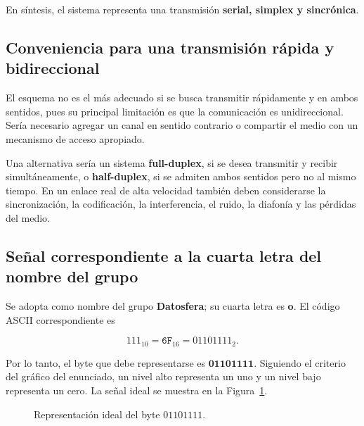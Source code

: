 \documentclass[12pt,a4paper]{article}
\begin{document}
En síntesis, el sistema representa una transmisión
\textbf{serial, simplex y sincrónica}.

\subsection{Conveniencia para una transmisión rápida y bidireccional}

El esquema no es el más adecuado si se busca transmitir rápidamente y en ambos
sentidos, pues su principal limitación es que la comunicación es unidireccional.
Sería necesario agregar un canal en sentido contrario o compartir el medio con
un mecanismo de acceso apropiado.

Una alternativa sería un sistema \textbf{full-duplex}, si se desea transmitir y
recibir simultáneamente, o \textbf{half-duplex}, si se admiten ambos sentidos
pero no al mismo tiempo. En un enlace real de alta velocidad también deben
considerarse la sincronización, la codificación, la interferencia, el ruido, la
diafonía y las pérdidas del medio.

\subsection{Señal correspondiente a la cuarta letra del nombre del grupo}

Se adopta como nombre del grupo \textbf{Datosfera}; su cuarta letra es
\textbf{o}. El código ASCII correspondiente es

\[
111_{10}=\mathtt{6F}_{16}=01101111_2.
\]

Por lo tanto, el byte que debe representarse es $\mathbf{01101111}$. Siguiendo
el criterio del gráfico del enunciado, un nivel alto representa un uno y un
nivel bajo representa un cero. La señal ideal se muestra en la
Figura~\ref{fig:uart}.

\begin{figure}[H]
\centering
{}
\caption{Representación ideal del byte $01101111$.}
\label{fig:uart}
\end{figure}
\end{document}
